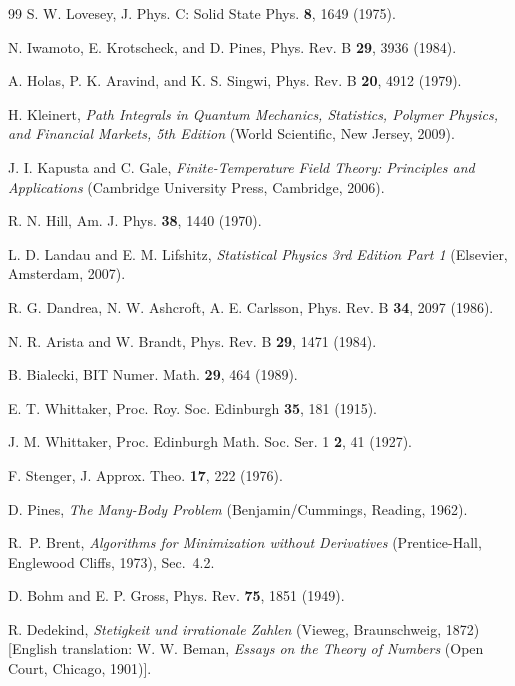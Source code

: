 \documentclass[aps,showkeys,noshowpacs,superscriptaddress,pre,preprint]{revtex4-2}
\begin{document}
\begin{thebibliography}{99}
 S. W. Lovesey, J. Phys. C: Solid State Phys. \textbf{8}, 1649 (1975).

 N. Iwamoto, E. Krotscheck, and D. Pines, Phys. Rev. B \textbf{29}, 3936 (1984).

 A. Holas, P. K. Aravind, and K. S. Singwi, Phys. Rev. B \textbf{20}, 4912 (1979).

 H. Kleinert, \textit{Path Integrals in Quantum Mechanics, Statistics, Polymer Physics, and Financial Markets, 5th Edition}
(World Scientific, New Jersey, 2009).

 J. I. Kapusta and C. Gale, \textit{Finite-Temperature Field Theory: Principles and Applications} 
(Cambridge University Press, Cambridge, 2006).

 R. N. Hill, Am. J. Phys. \textbf{38}, 1440 (1970).

 L. D. Landau and E. M. Lifshitz, \textit{Statistical Physics 3rd Edition Part 1}
(Elsevier, Amsterdam, 2007).

 R. G. Dandrea, N. W. Ashcroft, A. E. Carlsson, Phys. Rev. B \textbf{34}, 2097 (1986).

 N. R. Arista and W. Brandt, Phys. Rev. B \textbf{29}, 1471 (1984).

 B. Bialecki, BIT Numer. Math. \textbf{29}, 464 (1989).

 E. T. Whittaker, Proc. Roy. Soc. Edinburgh \textbf{35}, 181 (1915).

 J. M. Whittaker, Proc. Edinburgh Math. Soc. Ser. 1 \textbf{2}, 41 (1927).

 F. Stenger, J. Approx. Theo. \textbf{17}, 222 (1976).

 D. Pines, \textit{The Many-Body Problem} (Benjamin/Cummings, Reading, 1962).

 R.~P. Brent, \textit{Algorithms for Minimization without Derivatives}
(Prentice-Hall, Englewood Cliffs, 1973), Sec.~4.2.

 D. Bohm and E. P. Gross, Phys. Rev. \textbf{75}, 1851 (1949).

 R. Dedekind, \textit{Stetigkeit und irrationale Zahlen}
(Vieweg, Braunschweig, 1872)
[English translation: W. W. Beman, \textit{Essays on the Theory of Numbers}
(Open Court, Chicago, 1901)].


\end{thebibliography}
\end{document}
